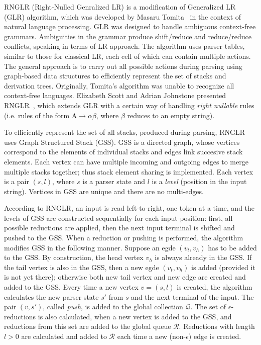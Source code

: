 RNGLR (Right-Nulled Genralized LR) is a modification of Generalized LR (GLR) algorithm, which
was developed by Masaru Tomita~\cite{Tomita} in the context of natural language processing. 
GLR was designed to handle ambiguous context-free grammars. Ambiguities in the grammar produce 
shift/reduce and reduce/reduce conflicts, speaking in terms of LR approach. The algorithm 
uses parser tables, similar to those for classical LR, each cell of which can contain multiple 
actions. The general approach is to carry out all possible actions during parsing 
using graph-based data structures to efficiently represent the set of stacks 
and derivation trees. Originally, Tomita's algorithm was unable to recognize all context-free languages.  
Elizabeth Scott and Adrian Johnstone presented RNGLR~\cite{RNGLR},
which extends GLR with a certain way of handling \emph{right nullable} 
rules (i.e. rules of the form $\mathrm{A} \rightarrow \alpha \beta$, where $\beta$ 
reduces to an empty string).

To efficiently represent the set of all stacks, produced during parsing,
RNGLR uses Graph Structured Stack (GSS). GSS is a directed graph,
whose vertices correspond to the elements of individual stacks and edges link succesive
stack elements. Each vertex can have multiple incoming and outgoing edges to merge 
multiple stacks together; thus stack element sharing is implemented. Each vertex is 
a pair $(s,l)$, where $s$ is a parser state and $l$ is a \emph{level} (position in the input string). 
Vertices in GSS are unique and there are no multi-edges. 

According to RNGLR, an input is read left-to-right, one token at a time, and 
the levels of GSS are constructed sequentially for each input position: first, all  
possible reductions are applied, then the next input terminal is shifted and
pushed to the GSS. When a reduction or pushing is performed, 
the algorithm modifies GSS in the following manner. Suppose an 
egde $(v_t,v_h)$ has to be added to the GSS. By construction, the head vertex
$v_h$ is always already in the GSS. If the tail vertex is also in the GSS, then
a new egde $(v_t,v_h)$ is added (provided it is not yet there); otherwise both 
new tail vertex and new edge are created and added to the GSS. Every time a new 
vertex $v=(s,l)$ is created, the algorithm calculates the new parser 
state $s'$ from $s$ and the next terminal of the input. The pair $(v,s')$, called 
\emph{push}, is added to the global collection $\mathcal{Q}$. The set of $\epsilon$-reductions 
is also calculated, when a new vertex is added to the GSS, and reductions from this set are added to the 
global queue $\mathcal{R}$. Reductions with length $l>0$ are calculated and added to $\mathcal{R}$ 
each time a new (non-$\epsilon$) edge is created. 

